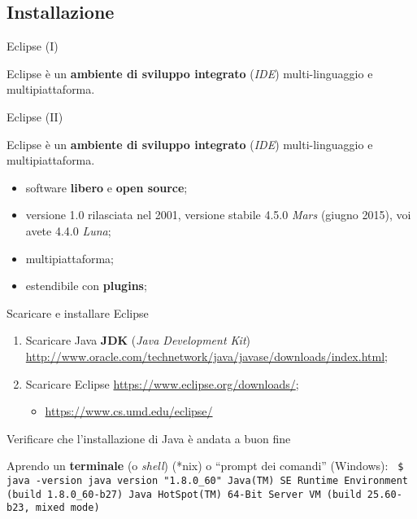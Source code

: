 \subsection[Installazione]{Installazione}

\begin{frame}{Eclipse (I)}

  Eclipse è un \textbf{ambiente di sviluppo integrato} (\emph{IDE}) multi-linguaggio e multipiattaforma.
  \begin{center}
  \end{center}

\end{frame}

\begin{frame}{Eclipse (II)}

  Eclipse è un \textbf{ambiente di sviluppo integrato} (\emph{IDE}) multi-linguaggio e multipiattaforma.
  
  \begin{itemize}
    \item software \textbf{libero} e \textbf{open source};
    \item versione 1.0 rilasciata nel 2001, versione stabile 4.5.0 \emph{Mars} (giugno 2015), voi avete 4.4.0 \emph{Luna};
    \item multipiattaforma;
    \item estendibile con \textbf{plugins};
  \end{itemize}
\end{frame}

\begin{frame}{Scaricare e installare Eclipse}

  \begin{enumerate}
    \item Scaricare Java \textbf{JDK} (\emph{Java Development Kit}) \url{http://www.oracle.com/technetwork/java/javase/downloads/index.html};
    \item Scaricare Eclipse \url{https://www.eclipse.org/downloads/};
    \begin{itemize}
      \item \url{https://www.cs.umd.edu/eclipse/}
    \end{itemize}
  \end{enumerate}
\end{frame}

\begin{frame}{Verificare che l'installazione di Java è andata a buon fine}

  Aprendo un \textbf{terminale} (o \emph{shell}) (*nix) o ``prompt dei comandi'' (Windows): \newline
  \texttt{
     \$ java -version \newline                                                                                                          
     java version "1.8.0\_60" \newline
     Java(TM) SE Runtime Environment (build 1.8.0\_60-b27) \newline
     Java HotSpot(TM) 64-Bit Server VM (build 25.60-b23, mixed mode)
     }

\end{frame}
 

